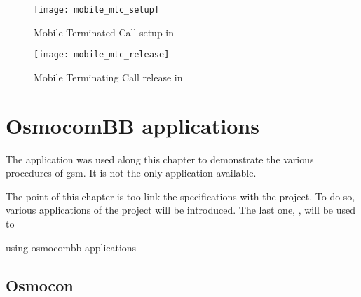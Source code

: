       \begin{figure}[h]
        \centering
        \texttt{[image: mobile\_mtc\_setup]}
        \caption{Mobile Terminated Call
          setup in ~\cite[p.~115]{3gpp_ts_2014-6}}
        \label{fig:mobile_mtc_setup}
      \end{figure}

      \begin{figure}[h]
        \centering
        \texttt{[image: mobile\_mtc\_release]}
        \caption{Mobile Terminating Call
        release in ~\cite[p.~116]{3gpp_ts_2014-6}}
        \label{fig:mobile_mtc_release}
      \end{figure}

      \iffalse
  \section{OsmocomBB applications}

    The  application was used along this chapter to
    demonstrate the various procedures of \gls{gsm}. It is not the only
    application available.


    The point of this chapter is too link the specifications with the
     project. To do so, various applications of the
    project will be introduced. The last one, , will be
    used to 



    using osmocombb applications
      ~\cite{osmocombb_applications}
      ~\cite{osmocombb_overview}

    \subsection{Osmocon}

    \iffalse
      \begin{figure}[h]
        \centering
        \texttt{[image: osmocombb\_arch1]}
        \caption{~\cite{osmocombb_overview}}
        \label{fig:osmocombb_arch1}
      \end{figure}

      \begin{figure}[h]
        \centering
        \texttt{[image: osmocombb\_arch2]}
        \caption{~\cite{osmocombb_overview}}
        \label{fig:osmocombb_arch2}
      \end{figure}

      \begin{figure}[h]
        \centering
        \texttt{[image: osmocombb\_arch3]}
        \caption{~\cite{osmocombb_overview}}
        \label{fig:osmocombb_arch3}
      \end{figure}
      \fi

